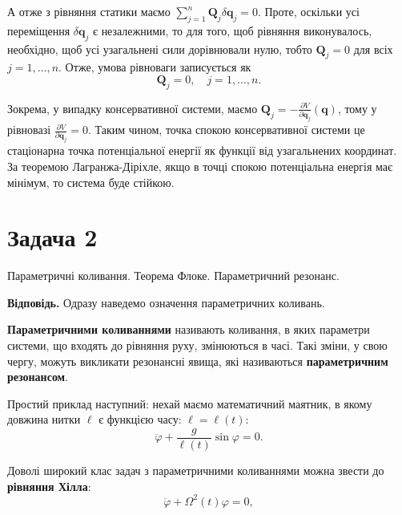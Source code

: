 \documentclass{hw_template}
\begin{document}
А отже з рівняння статики маємо $\sum_{j=1}^n \mathbf{Q}_j\delta \mathbf{q}_j =
0$. Проте, оскільки усі переміщення $\delta \mathbf{q}_j$ є незалежними, то
для того, щоб рівняння виконувалось, необхідно, щоб усі узагальнені сили
дорівнювали нулю, тобто $\mathbf{Q}_j=0$ для всіх $j=1,\dots,n$. Отже, 
умова рівноваги записується як
\begin{equation*}
    \boxed{\mathbf{Q}_j = 0, \quad j = 1,\dots,n.}
\end{equation*}

Зокрема, у випадку консервативної системи, маємо $\mathbf{Q}_j = -\frac{\partial
V}{\partial \mathbf{q}_j}(\mathbf{q})$, тому у рівновазі $\frac{\partial
V}{\partial \mathbf{q}_j}=0$. Таким чином, точка спокою консервативної 
системи це стаціонарна точка потенціальної енергії як функції від 
узагальнених координат. За теоремою Лагранжа-Діріхле, якщо в точці 
спокою потенціальна енергія має мінімум, то система буде стійкою.

\newpage 

\section{Задача 2}

\begin{problem}
    Параметричні коливання. Теорема Флоке. Параметричний резонанс.
\end{problem}

\textbf{Відповідь.} Одразу наведемо означення параметричних коливань.

\begin{definition}
\textbf{Параметричними коливаннями} називають коливання,
в яких параметри системи, що входять до рівняння руху, змінюються в часі. Такі 
зміни, у свою чергу, можуть викликати резонансні явища, які називаються
\textbf{параметричним резонансом}.
\end{definition}

Простий приклад наступний: нехай маємо математичний маятник, в якому 
довжина нитки $\ell$ є функцією часу: $\ell = \ell(t)$:
\begin{equation*}
    \ddot{\varphi} + \frac{g}{\ell(t)}\sin\varphi = 0.
\end{equation*}

Доволі широкий клас задач з параметричними коливаннями можна звести 
до \textbf{рівняння Хілла}:
\begin{equation*}
    \ddot{\varphi} + \Omega^2(t)\varphi = 0, 
\end{equation*}
\end{document}
